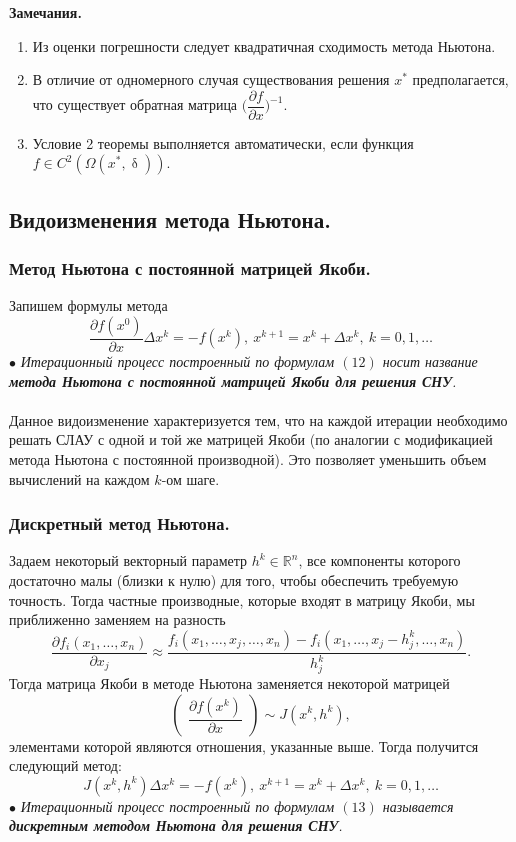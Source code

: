 \documentclass[a4paper, 12pt]{report}
\numberwithin{equation}{section}
\newcommand{\Rm}{\mathbb{R}}
\renewcommand{\delta}{\updelta}
\renewcommand{\d}{\partial}
\begin{document}
\textbf{Замечания.}\begin{enumerate}
	\item Из оценки погрешности следует квадратичная сходимость метода Ньютона.
	\item В отличие от одномерного случая существования решения  $x^*$ предполагается, что существует обратная матрица $\Big(\dfrac{\partial f}{\partial x}\Big)^{-1}$.
	\item Условие 2 теоремы выполняется автоматически, если функция $f\in C^{2}(\Omega(x^*, \delta))$.
\end{enumerate}
\subsection{Видоизменения метода Ньютона.}
\subsubsection{Метод Ньютона с постоянной матрицей Якоби.}
Запишем формулы метода 
\begin{equation}
	\dfrac{\d f(x^0)}{\d x}\Delta x^k = -f(x^k),\ x^{k+1} = x^k + \Delta x^k,\ k=0,1,\ldots
\end{equation}
$\bullet$ \textit{Итерационный процесс построенный по формулам $(12)$ носит название \textbf{метода Ньютона с постоянной матрицей Якоби для решения СНУ}.}\\\\
Данное видоизменение характеризуется тем, что на каждой итерации необходимо решать СЛАУ с одной и той же матрицей Якоби (по аналогии с модификацией метода Ньютона с постоянной производной). Это позволяет уменьшить объем вычислений на каждом $k$-ом шаге. 
\subsubsection{Дискретный метод Ньютона.}
Задаем некоторый векторный параметр $h^k \in \Rm^n$, все компоненты которого достаточно малы (близки к нулю) для того, чтобы обеспечить требуемую точность. Тогда частные производные, которые входят в матрицу Якоби, мы приближенно заменяем на разность $$\dfrac{\d f_i(x_1,\ldots, x_n)}{\d x_j} \approx \dfrac{f_i(x_1,\ldots, x_j,\ldots, x_n) - f_i(x_1,\ldots, x_j-h_j^k,\ldots, x_n)}{h_j^k}.$$
Тогда матрица Якоби в методе Ньютона заменяется некоторой матрицей $$\begin{pmatrix}
	\dfrac{\d f(x^k)}{\d x}
\end{pmatrix}\sim J(x^k, h^k),$$
элементами которой являются отношения, указанные выше. Тогда получится следующий метод: 
\begin{equation}
	J(x^k, h^k) \Delta x^k =  -f(x^k),\ x^{k+1} = x^k + \Delta x^k,\ k=0,1,\ldots
\end{equation} 
$\bullet$ \textit{Итерационный процесс построенный по формулам $(13)$ называется \textbf{дискретным методом Ньютона для решения СНУ}.}
\end{document}

